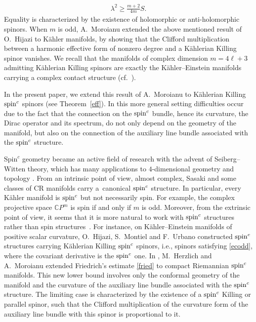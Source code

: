 \documentclass[pdftex]{sigma}
\numberwithin{equation}{section}
\theoremstyle{definition}
\begin{document}
\begin{gather}\label{kirchke}
\lambda^2 \geq \frac{m+2}{4m} S.
\end{gather}
Equality is characterized by the existence of holomorphic or anti-holomorphic spinors.
When $m$ is odd, A.~Moroianu extended the above mentioned result of O.~Hijazi to K\"ahler manifolds, by showing that
the Clif\/ford multiplication between a harmonic  ef\/fective form of nonzero degree and a K\"ahlerian Killing spinor vanishes.
We recall that the manifolds  of complex dimension $m =4\ell+3$ admitting K\"ahlerian Killing spinors are exactly
the K\"ahler--Einstein manifolds carrying a complex contact structure (cf.~\cite{ks, am_odd, ms}).

In the present paper, we extend this result of A.~Moroianu to K\"ahlerian Killing ${\mathop{\rm spin}^c}$ spinors (see Theorem~\ref{eff}). In this more general setting dif\/f\/iculties occur due to the fact that the connection on the ${\mathop{\rm spin}^c}$ bundle, hence its curvature, the Dirac operator and its spectrum,  do not only depend on the geometry of the manifold, but also on the connection
of the auxiliary line bundle associated with the ${\mathop{\rm spin}^c}$ structure.


$ \mathrm{Spin}^c$ geometry became an active f\/ield of research with the advent
of Seiberg--Witten theory, which has many applications to $4$-dimensional geometry and topology \cite{don,gursky,lebrun1,lebrun2,SW3, SW2}.
From an intrinsic point of view,
almost complex, Sasaki and some classes of CR manifolds carry a~canonical ${\mathop{\rm spin}^c}$ structure.
In particular, every K\"ahler manifold is ${\mathop{\rm spin}^c}$ but not necessarily spin.
For example, the complex projective space $\mathbb C P^m$ is spin if and only if $m$ is odd. Moreover, from the extrinsic point of view, it seems that it is more natural to work with ${\mathop{\rm spin}^c}$ structures rather than spin structu\-res~\cite{hmu, nakadthesis,JRRN}. For instance, on K\"ahler--Einstein manifolds of positive scalar curvature, O.~Hijazi, S.~Montiel and F.~Urbano \cite{hmu} constructed
${\mathop{\rm spin}^c}$ structures carrying  K\"ahlerian Killing  ${\mathop{\rm spin}^c}$ spinors, i.e., spinors satisfying \eqref{ecodd}, where the covariant derivative is the ${\mathop{\rm spin}^c}$ one. In \cite{her}, M.~Herzlich and A.~Moroianu  extended Friedrich's estimate \eqref{fried} to compact Riemannian ${\mathop{\rm spin}^c}$ manifolds. This new lower bound involves only the conformal geometry of the manifold and the curvature of the auxiliary line bundle associated with the ${\mathop{\rm spin}^c}$ structure. The limiting case is characterized by the existence of a ${\mathop{\rm spin}^c}$ Killing  or parallel spinor, such that the Clif\/ford multiplication of the curvature form of the auxiliary line bundle with this spinor is proportional to it.
\end{document}
